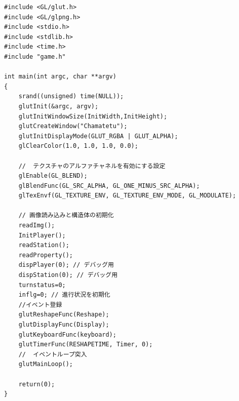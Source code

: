 \documentclass[a4j]{jarticle}
\begin{document}
    \begin{lstlisting}[basicstyle=\ttfamily\footnotesize, frame=single,label=main,caption=main関数]
#include <GL/glut.h>
#include <GL/glpng.h>
#include <stdio.h>
#include <stdlib.h>
#include <time.h>
#include "game.h"

int main(int argc, char **argv)
{
    srand((unsigned) time(NULL));
    glutInit(&argc, argv);
    glutInitWindowSize(InitWidth,InitHeight);
    glutCreateWindow("Chamatetu");
    glutInitDisplayMode(GLUT_RGBA | GLUT_ALPHA);
    glClearColor(1.0, 1.0, 1.0, 0.0);

    //  テクスチャのアルファチャネルを有効にする設定
    glEnable(GL_BLEND);
    glBlendFunc(GL_SRC_ALPHA, GL_ONE_MINUS_SRC_ALPHA);
    glTexEnvf(GL_TEXTURE_ENV, GL_TEXTURE_ENV_MODE, GL_MODULATE);
    
    // 画像読み込みと構造体の初期化
    readImg();
    InitPlayer();
    readStation();
    readProperty();
    dispPlayer(0); // デバッグ用
    dispStation(0); // デバッグ用
    turnstatus=0;
    inflg=0; // 進行状況を初期化
    //イベント登録
    glutReshapeFunc(Reshape);
    glutDisplayFunc(Display);
    glutKeyboardFunc(keyboard);
    glutTimerFunc(RESHAPETIME, Timer, 0);
    //  イベントループ突入
    glutMainLoop();

    return(0);
}
\end{lstlisting}  
\end{document}
